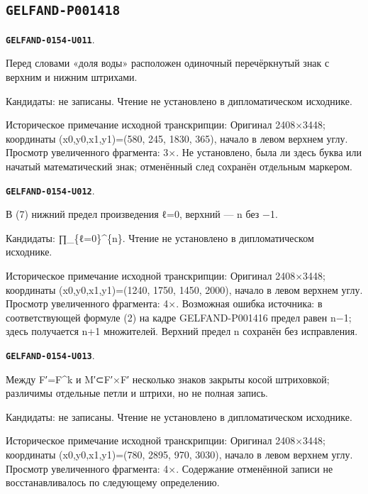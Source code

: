 \documentclass[11pt]{article}
\theoremstyle{definition}
\theoremstyle{remark}
\begin{document}
\subsection*{\texttt{GELFAND-P001418}}
\par\noindent\leavevmode{}\label{GELFAND-0154-U011}\label{GELFAND-P001418:basin-cancelled-sign:note}\textbf{\texttt{GELFAND-0154-U011}}.\nopagebreak[4]\par
Перед словами «доля воды» расположен одиночный перечёркнутый знак с верхним и нижним штрихами.\par
Кандидаты: не записаны. Чтение не установлено в дипломатическом исходнике.\par
Историческое примечание исходной транскрипции: Оригинал 2408×3448; координаты (x0,y0,x1,y1)=(580, 245, 1830, 365), начало в левом верхнем углу. Просмотр увеличенного фрагмента: 3×. Не установлено, была ли здесь буква или начатый математический знак; отменённый след сохранён отдельным маркером.\par\medskip
\par\noindent\leavevmode{}\label{GELFAND-0154-U012}\label{GELFAND-P001418:eq7-upper-product-bound:note}\textbf{\texttt{GELFAND-0154-U012}}.\nopagebreak[4]\par
В (7) нижний предел произведения ℓ=0, верхний — n без −1.\par
Кандидаты: ∏\_\{ℓ=0\}\textasciicircum{}\{n\}. Чтение не установлено в дипломатическом исходнике.\par
Историческое примечание исходной транскрипции: Оригинал 2408×3448; координаты (x0,y0,x1,y1)=(1240, 1750, 1450, 2000), начало в левом верхнем углу. Просмотр увеличенного фрагмента: 4×. Возможная ошибка источника: в соответствующей формуле (2) на кадре GELFAND-P001416 предел равен n−1; здесь получается n+1 множителей. Верхний предел n сохранён без исправления.\par\medskip
\par\noindent\leavevmode{}\label{GELFAND-0154-U013}\label{GELFAND-P001418:before-m-prime-cancelled:note}\textbf{\texttt{GELFAND-0154-U013}}.\nopagebreak[4]\par
Между F′=F\textasciicircum{}k и M′⊂F′×F′ несколько знаков закрыты косой штриховкой; различимы отдельные петли и штрихи, но не полная запись.\par
Кандидаты: не записаны. Чтение не установлено в дипломатическом исходнике.\par
Историческое примечание исходной транскрипции: Оригинал 2408×3448; координаты (x0,y0,x1,y1)=(780, 2895, 970, 3030), начало в левом верхнем углу. Просмотр увеличенного фрагмента: 4×. Содержание отменённой записи не восстанавливалось по следующему определению.\par\medskip
\end{document}
